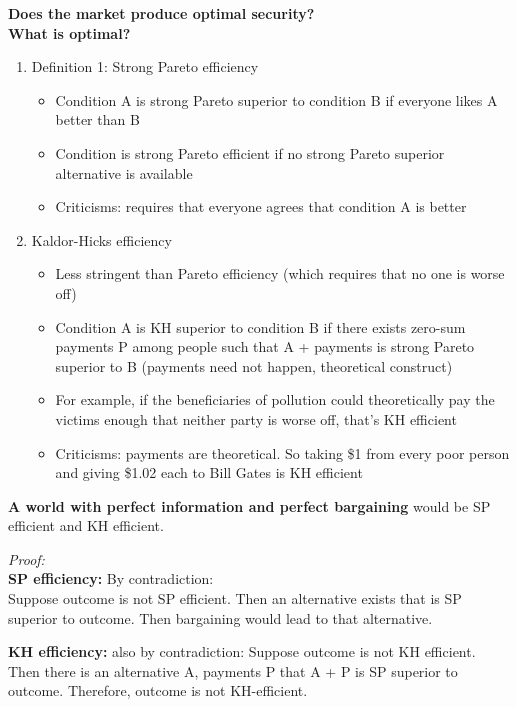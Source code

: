 
\textbf{Does the market produce optimal security?}\\
\textbf{What is optimal?}

\begin{enumerate}
	\item Definition 1: Strong Pareto efficiency

	\begin{itemize}
		\item Condition A is strong Pareto superior to condition B if everyone likes A better than B
		\item Condition is strong Pareto efficient if no strong Pareto superior alternative is available
		\item Criticisms: requires that everyone agrees that condition A is better
	\end{itemize}
	
	\item Kaldor-Hicks efficiency

	\begin{itemize}
		\item Less stringent than Pareto efficiency (which requires that no one is worse off)
		\item  Condition A is KH superior to condition B if there exists zero-sum payments P among people such that A + payments is strong Pareto superior to B
	(payments need not happen, theoretical construct)
		\item For example, if the beneficiaries of pollution could theoretically pay the victims enough that neither party is worse off, that's KH efficient
		\item Criticisms: payments are theoretical. So taking \$1 from every poor person and giving \$1.02 each to Bill Gates is KH efficient
	\end{itemize}
\end{enumerate}

\textbf{A world with perfect information and perfect bargaining} would be SP efficient and KH efficient. 

\textit{Proof:}\\
\textbf{SP efficiency:} By contradiction: \\
	Suppose outcome is not SP efficient. Then an alternative exists that is SP superior to outcome. Then bargaining would lead to that alternative.

\textbf{KH efficiency:} also by contradiction:
	Suppose outcome is not KH efficient. Then there is an alternative A, payments P that A + P is SP superior to outcome. Therefore, outcome is not KH-efficient.


